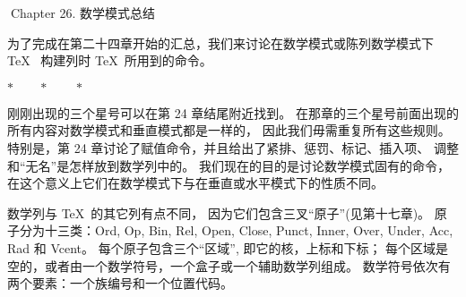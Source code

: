 


\beginchapter Chapter 26. 数学模式总结


\1为了完成在第二十四章开始的汇总，我们来讨论在数学模式或陈列数学模式下 \TeX\ %
构建列时 \TeX\ 所用到的命令。

\ninepoint
\def\\{\smallbreak\textindent{$\bull$}}
\medbreak
\centerline{$*\qquad*\qquad*$}
\medskip\noindent
刚刚出现的三个星号可以在第 24 章结尾附近找到。
在那章的三个星号前面出现的所有内容对数学模式和垂直模式都是一样的，
因此我们毋需重复所有这些规则。
特别是，第 24 章讨论了赋值命令，并且给出了紧排、惩罚、标记、插入项、
调整和``无名''是怎样放到数学列中的。
我们现在的目的是讨论数学模式固有的命令，
在这个意义上它们在数学模式下与在垂直或水平模式下的性质不同。

数学列与 \TeX\ 的其它列有点不同，
因为它们包含三叉``原子''(见第十七章)。%
原子分为十三类：Ord, Op, Bin, Rel, Open, Close, Punct, Inner, Over, Under, Acc,
Rad 和 Vcent。%
每个原子包含三个``区域'', 即它的核，上标和下标；
每个区域是空的，或者由一个数学符号，一个盒子或一个辅助数学列组成。%
数学符号依次有两个要素：一个族编号和一个位置代码。

